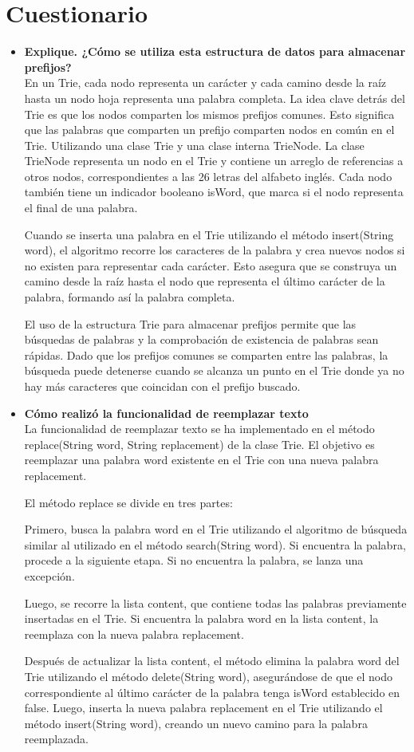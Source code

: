 \documentclass{article}
\begin{document}
	\section{Cuestionario}
\begin{itemize}
	\item \textbf{Explique. ¿Cómo se utiliza esta estructura de datos para almacenar prefijos?} \\
		En un Trie, cada nodo representa un carácter y cada camino desde la raíz hasta un nodo hoja representa una palabra completa. La idea clave detrás del Trie es que los nodos comparten los mismos prefijos comunes. Esto significa que las palabras que comparten un prefijo comparten nodos en común en el Trie. 
		Utilizando una clase Trie y una clase interna TrieNode. La clase TrieNode representa un nodo en el Trie y contiene un arreglo de referencias a otros nodos, correspondientes a las 26 letras del alfabeto inglés. Cada nodo también tiene un indicador booleano isWord, que marca si el nodo representa el final de una palabra.

Cuando se inserta una palabra en el Trie utilizando el método insert(String word), el algoritmo recorre los caracteres de la palabra y crea nuevos nodos si no existen para representar cada carácter. Esto asegura que se construya un camino desde la raíz hasta el nodo que representa el último carácter de la palabra, formando así la palabra completa.

El uso de la estructura Trie para almacenar prefijos permite que las búsquedas de palabras y la comprobación de existencia de palabras sean rápidas. Dado que los prefijos comunes se comparten entre las palabras, la búsqueda puede detenerse cuando se alcanza un punto en el Trie donde ya no hay más caracteres que coincidan con el prefijo buscado.
	\item \textbf{Cómo realizó la funcionalidad de reemplazar texto} \\
	La funcionalidad de reemplazar texto se ha implementado en el método replace(String word, String replacement) de la clase Trie. El objetivo es reemplazar una palabra word existente en el Trie con una nueva palabra replacement.

El método replace se divide en tres partes:

    Primero, busca la palabra word en el Trie utilizando el algoritmo de búsqueda similar al utilizado en el método search(String word). Si encuentra la palabra, procede a la siguiente etapa. Si no encuentra la palabra, se lanza una excepción.

    Luego, se recorre la lista content, que contiene todas las palabras previamente insertadas en el Trie. Si encuentra la palabra word en la lista content, la reemplaza con la nueva palabra replacement.

    Después de actualizar la lista content, el método elimina la palabra word del Trie utilizando el método delete(String word), asegurándose de que el nodo correspondiente al último carácter de la palabra tenga isWord establecido en false. Luego, inserta la nueva palabra replacement en el Trie utilizando el método insert(String word), creando un nuevo camino para la palabra reemplazada.
\end{itemize}
	\clearpage
	
\end{document}
